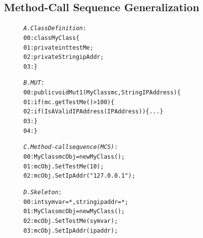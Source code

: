 \subsection{Method-Call Sequence Generalization}

\begin{figure}[t]
\begin{CodeOut}
\begin{alltt}

\emph{A. Class Definition}:
00:class MyClass \{ 
01:\hspace*{0.1in}private int testMe;	
02:\hspace*{0.1in}private String ipAddr;	
03:\}

\emph{B. MUT}:
00:public void Mut1(MyClass mc, String IPAddress) \{
01:\hspace*{0.1in}if(mc.getTestMe() > 100) \{ 
02:\hspace*{0.2in}if(IsAValidIPAddress(IPAddress)) \{ ... \}
03:\hspace*{0.1in}\}
04:\}

\emph{C. Method-call sequence (MCS)}:
00:MyClass mcObj = new MyClass();
01:mcObj.SetTestMe(10);
02:mcObj.SetIpAddr("127.0.0.1");

\emph{D. Skeleton}:
00:int symvar = *, string ipaddr = *; 
01:MyClass mcObj = new MyClass();
02:mcObj.SetTestMe(symvar);
03:mcObj.SetIpAddr(ipaddr);

\end{alltt}
\end{CodeOut}\vspace*{-5ex}
\vspace*{-3ex}
\end{figure}


